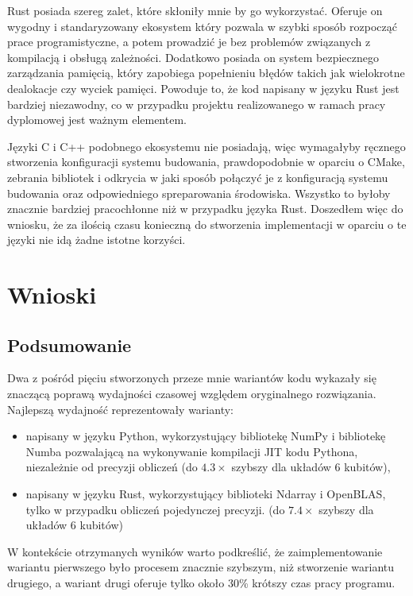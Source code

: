 \documentclass[11pt, a4paper]{article}
\begin{document}
\begin{sloppypar}
    Rust posiada szereg zalet, które skłoniły mnie by go wykorzystać. Oferuje on wygodny
    i standaryzowany ekosystem który pozwala w szybki sposób rozpocząć prace
    programistyczne, a potem prowadzić je bez problemów związanych z kompilacją i obsługą
    zależności. Dodatkowo posiada on system bezpiecznego zarządzania pamięcią, który zapobiega
    popełnieniu błędów takich jak wielokrotne dealokacje czy wyciek pamięci. Powoduje to,
    że kod napisany w języku Rust jest bardziej niezawodny, co w przypadku projektu
    realizowanego w ramach pracy dyplomowej jest ważnym elementem.

    Języki C i C++ podobnego ekosystemu nie posiadają, więc wymagałyby ręcznego stworzenia
    konfiguracji systemu budowania, prawdopodobnie w oparciu o CMake, zebrania bibliotek
    i odkrycia w jaki sposób połączyć je z konfiguracją systemu budowania oraz odpowiedniego
    spreparowania środowiska. Wszystko to byłoby znacznie bardziej pracochłonne niż w
    przypadku języka Rust. Doszedłem więc do wniosku, że za ilością czasu konieczną do
    stworzenia implementacji w oparciu o te języki nie idą żadne istotne korzyści.

    \section{Wnioski}
    \subsection{Podsumowanie}
    Dwa z pośród pięciu stworzonych przeze mnie wariantów kodu wykazały się znaczącą
    poprawą wydajności czasowej względem oryginalnego rozwiązania. Najlepszą wydajność reprezentowały
    warianty:
    \begin{itemize}
      \item napisany w języku Python, wykorzystujący bibliotekę NumPy i bibliotekę Numba
        pozwalającą na wykonywanie kompilacji JIT kodu Pythona, niezależnie od precyzji obliczeń
        (do $4.3\times$ szybszy dla układów 6 kubitów),

      \item napisany w języku Rust, wykorzystujący biblioteki Ndarray i OpenBLAS, tylko w
        przypadku obliczeń pojedynczej precyzji. (do $7.4\times$ szybszy dla układów 6 kubitów)
    \end{itemize}
    W kontekście otrzymanych wyników warto podkreślić, że zaimplementowanie wariantu pierwszego
    było procesem znacznie szybszym, niż stworzenie wariantu drugiego, a wariant drugi oferuje
    tylko około 30\% krótszy czas pracy programu.


\end{sloppypar}
\end{document}
